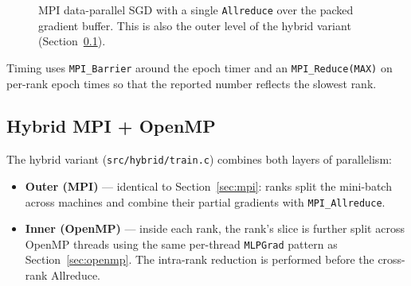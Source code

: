 \documentclass[11pt,a4paper]{article}
\begin{document}
\begin{figure}[H]
  \centering
  \caption{MPI data-parallel SGD with a single \texttt{Allreduce} over the
  packed gradient buffer. This is also the outer level of the hybrid
  variant (Section~\ref{sec:hybrid}).}
  \label{fig:mpi}
\end{figure}

Timing uses \texttt{MPI\_Barrier} around the epoch timer and an
\texttt{MPI\_Reduce(MAX)} on per-rank epoch times so that the reported
number reflects the slowest rank.

\subsection{Hybrid MPI + OpenMP}\label{sec:hybrid}

The hybrid variant (\texttt{src/hybrid/train.c}) combines both layers of
parallelism:

\begin{itemize}[noitemsep,topsep=2pt]
  \item \textbf{Outer (MPI)} --- identical to Section~\ref{sec:mpi}:
  ranks split the mini-batch across machines and combine their partial
  gradients with \texttt{MPI\_Allreduce}.
  \item \textbf{Inner (OpenMP)} --- inside each rank, the rank's slice is
  further split across OpenMP threads using the same per-thread
  \texttt{MLPGrad} pattern as Section~\ref{sec:openmp}. The intra-rank
  reduction is performed before the cross-rank Allreduce.
\end{itemize}
\end{document}
